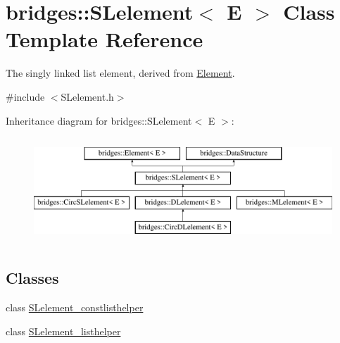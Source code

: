 \hypertarget{classbridges_1_1_s_lelement}{}\section{bridges\+::S\+Lelement$<$ E $>$ Class Template Reference}
\label{classbridges_1_1_s_lelement}


The singly linked list element, derived from \mbox{\hyperlink{classbridges_1_1_element}{Element}}.  




{\ttfamily \#include $<$S\+Lelement.\+h$>$}

Inheritance diagram for bridges\+::S\+Lelement$<$ E $>$\+:\begin{figure}[H]
\begin{center}
\leavevmode
\includegraphics[height=4.000000cm]{classbridges_1_1_s_lelement}
\end{center}
\end{figure}
\subsection*{Classes}
\begin{DoxyCompactItemize}
\item 
class \mbox{\hyperlink{classbridges_1_1_s_lelement_1_1_s_lelement__constlisthelper}{S\+Lelement\+\_\+constlisthelper}}
\item 
class \mbox{\hyperlink{classbridges_1_1_s_lelement_1_1_s_lelement__listhelper}{S\+Lelement\+\_\+listhelper}}
\end{DoxyCompactItemize}
